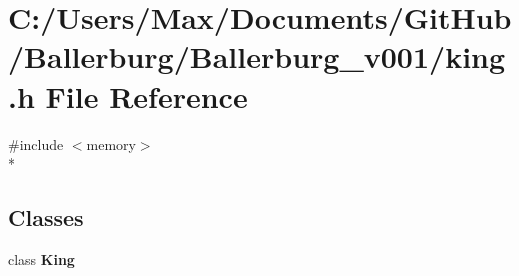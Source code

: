 \section{C\+:/\+Users/\+Max/\+Documents/\+Git\+Hub/\+Ballerburg/\+Ballerburg\+\_\+v001/king.h File Reference}
\label{king_8h}
{\ttfamily \#include $<$memory$>$}\\*
\subsection*{Classes}
\begin{DoxyCompactItemize}
\item 
class {\bf King}
\end{DoxyCompactItemize}
